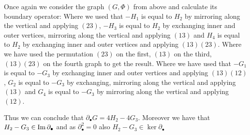 \begin{eg}
	Once again we consider the graph $(G,\Phi)$ from above and calculate its boundary operator:
	Where we used that $-H_{1}$ is equal to $H_{2}$ by mirroring along the vertical and applying $(2 3)$,
	$-H_{3}$ is equal to $H_2$ by exchanging inner and outer vertices, mirroring along the vertical and applying $(1 3)$ and
	$H_{4}$ is equal to $H_{2}$ by exchanging inner and outer vertices and applying $(1 3)(2 3)$.
	Where we have used the permutation $(2 3)$ on the first,  $(1 3)$ on the third, $(1 3)(2 3)$ on the fourth graph to get the result.
	Where we have used that $-G_{1}$ is equal to $-G_{3}$ by exchanging inner and outer vertices and applying $(1 3)(1 2)$,
	$G_{2}$ is equal to $-G_{3}$ by exchanging, mirroring along the vertical and applying $(1 3)$ and
	$G_{4}$ is equal to $-G_{3}$ by mirroring along the vertical and applying $(1 2)$. 

	Thus we can conclude that $\partial_{\bullet} G = 4 H_2 - 4 G_3$. Moreover we have that $H_2 - G_3 \in \operatorname{Im} \partial_{\bullet}$ and 
	as $\partial_{\bullet}^2=0$ also $H_2 - G_3 \in \ker \partial_{\bullet}$
\end{eg}

\printbibliography




